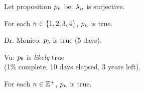 \documentclass[letterpaper, 14pt]{extarticle}
\begin{document}
\begin{flushleft}
\begin{definition}
Let proposition $p_{n}$ be: $\lambda_{n}$ is surjective.
\end{definition}

\begin{remark}
For each $n \in \{1, 2, 3, 4\}$, $p_{n}$ is true.
\end{remark}

\begin{remark}
Dr. Monico: $p_{5}$ is true (5 days).
\end{remark}

\begin{remark}
Vu: $p_{6}$ is \emph{likely} true \\
(1\% complete, 10 days elapsed, 3 years left).
\end{remark}

\begin{conjecture}
For each $n \in \mathbb{Z}^+$, $p_{n}$ is true.
\end{conjecture}


\end{flushleft}
\end{document}
